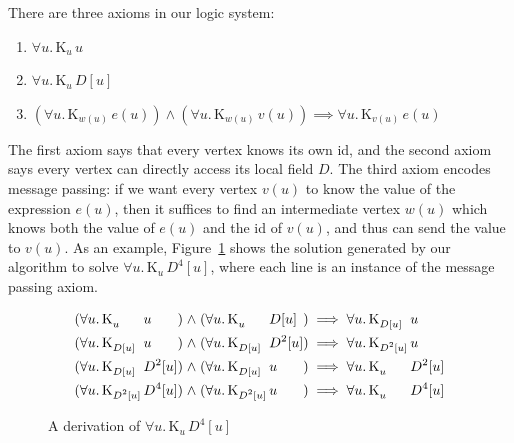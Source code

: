 \documentclass{sokendai_thesis} %
\newcommand{\knows}[2]{\mathrm K_{#1}\,{#2}}
\begin{document}
There are three axioms in our logic system:
\begin{enumerate}
\item $\forall u.\,\knows{u}{u}$
\item $\forall u.\,\knows{u}{\mathit{D}[u]}$
\item $(\forall u.\,\knows{w(u)}{e(u)}) \wedge (\forall u.\,\knows{w(u)}{v(u)}) \implies \forall u.\,\knows{v(u)}{e(u)}$
\end{enumerate}
The first axiom says that every vertex knows its own id, and the second axiom says every vertex can directly access its local field $D$.
The third axiom encodes message passing: if we want every vertex $v(u)$ to know the value of the expression $e(u)$, then it suffices to find an intermediate vertex $w(u)$ which knows both the value of $e(u)$ and the id of $v(u)$, and thus can send the value to $v(u)$.
As an example, Figure~\ref{fig:d4u-rules} shows the solution generated by our algorithm to solve $\forall u.\,\knows{u}{D^4[u]}$, where each line is an instance of the message passing axiom.

\begin{figure}[t]
\normalsize
\begin{align*}
(\forall u.\,\knows{\mathrlap{u}\phantom{D^2[u]}}{\mathrlap{u}\phantom{D^2[u]}}) \mathrel\wedge (\forall u.\,\knows{\mathrlap{u}\phantom{D^2[u]}}{\mathrlap{D[u]}\phantom{D^2[u]}}) &\implies \forall u.\,\knows{\mathrlap{D[u]}\phantom{D^2[u]}}{u} \\
(\forall u.\,\knows{\mathrlap{D[u]}\phantom{D^2[u]}}{\mathrlap{u}\phantom{D^2[u]}}) \mathrel\wedge (\forall u.\,\knows{\mathrlap{D[u]}\phantom{D^2[u]}}{D^2[u]}) &\implies \forall u.\,\knows{\mathrlap{D^2[u]}\phantom{D^2[u]}}{u} \\
(\forall u.\,\knows{\mathrlap{D[u]}\phantom{D^2[u]}}{D^2[u]}) \mathrel\wedge (\forall u.\,\knows{\mathrlap{D[u]}\phantom{D^2[u]}}{\mathrlap{u}\phantom{D^2[u]}}) &\implies \forall u.\,\knows{\mathrlap{u}\phantom{D^2[u]}}{D^2[u]} \\
(\forall u.\,\knows{\mathrlap{D^2[u]}\phantom{D^2[u]}}{D^4[u]}) \mathrel\wedge (\forall u.\,\knows{\mathrlap{D^2[u]}\phantom{D^2[u]}}{\mathrlap{u}\phantom{D^2[u]}}) &\implies \forall u.\,\knows{\mathrlap{u}\phantom{D^2[u]}}{D^4[u]}
\end{align*}
\vspace{-4ex}
\caption{A derivation of $\forall u.\,\knows{u}{D^4[u]}$}
\label{fig:d4u-rules}
\end{figure}
\end{document}
